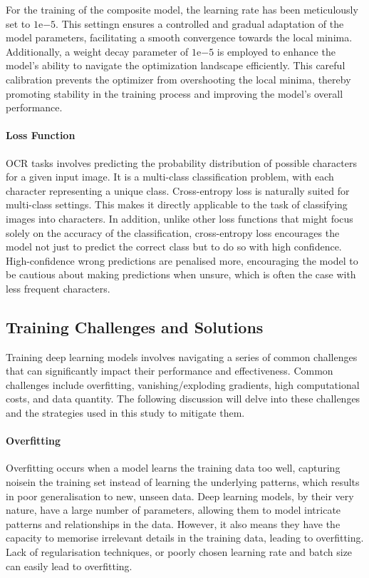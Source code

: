For the training of the composite model, the learning rate has been meticulously set to $1\mathrm{e}{-5}$. This settingn ensures a controlled and gradual adaptation of the model parameters, facilitating a smooth convergence towards the local minima. Additionally, a weight decay parameter of $1\mathrm{e}{-5}$ is employed to enhance the model's ability to navigate the optimization landscape efficiently. This careful calibration prevents the optimizer from overshooting the local minima, thereby promoting stability in the training process and improving the model's overall performance.

\paragraph*{Loss Function}
\label{par:3_loss_function}
OCR tasks involves predicting the probability distribution of possible characters for a given input image. It is a multi-class classification problem, with each character representing a unique class. Cross-entropy loss is naturally suited for multi-class settings. This makes it directly applicable to the task of classifying images into characters. In addition, unlike other loss functions that might focus solely on the accuracy of the classification, cross-entropy loss encourages the model not just to predict the correct class but to do so with high confidence. High-confidence wrong predictions are penalised more, encouraging the model to be cautious about making predictions when unsure, which is often the case with less frequent characters.
\subsection{Training Challenges and Solutions}
\label{subsec:3_training_challenges_and_solutions}
Training deep learning models involves navigating a series of common challenges that can significantly impact their performance and effectiveness. Common challenges include overfitting, vanishing/exploding gradients, high computational costs, and data quantity. The following discussion will delve into these challenges and the strategies used in this study to mitigate them.

\paragraph*{Overfitting}
\label{par:3_overfitting}
Overfitting occurs when a model learns the training data too well, capturing noisein the training set instead of learning the underlying patterns, which results in poor generalisation to new, unseen data. Deep learning models, by their very nature, have a large number of parameters, allowing them to model intricate patterns and relationships in the data. However, it also means they have the capacity to memorise irrelevant details in the training data, leading to overfitting. Lack of regularisation techniques, or poorly chosen learning rate and batch size can easily lead to overfitting. 

